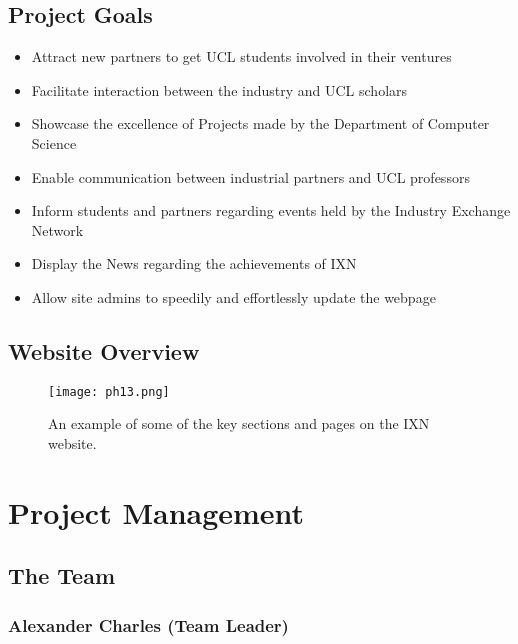 \documentclass[fontsize=11pt]{extarticle}
\numberwithin{figure}{section} %
\begin{document}
\hypertarget{project-goals}{%
\subsection{Project Goals}\label{project-goals}}

\begin{itemize}
\item
  Attract new partners to get UCL students involved in their ventures
\item
  Facilitate interaction between the industry and UCL scholars
\item
  Showcase the excellence of Projects made by the Department of Computer
  Science
\item
  Enable communication between industrial partners and UCL professors
\item
  Inform students and partners regarding events held by the Industry
  Exchange Network
\item
  Display the News regarding the achievements of IXN
\item
  Allow site admins to speedily and effortlessly update the webpage
\end{itemize}

\hypertarget{website-overview}{%
\subsection{Website Overview}\label{website-overview}}

\begin{figure}[H]
      \centering
      \texttt{[image: ph13.png]}
      \caption{An example of some of the key sections and pages on the IXN website.}
 \end{figure}

\hypertarget{project-management}{%
\section{Project Management}\label{project-management}}

\hypertarget{the-team}{%
\subsection{The Team}\label{the-team}}

\hypertarget{alexander-charles-team-leader}{%
\subsubsection{Alexander Charles (Team
Leader)}\label{alexander-charles-team-leader}}
\end{document}
